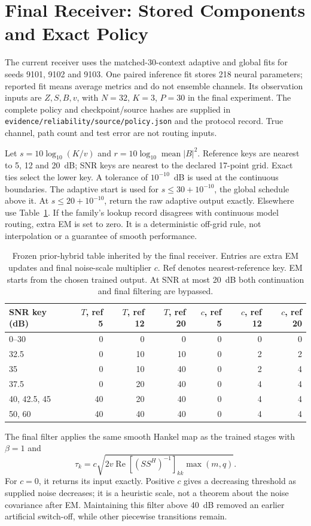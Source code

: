 \section{Final Receiver: Stored Components and Exact Policy}
The current receiver uses the matched-30-context adaptive and global fits for seeds 9101, 9102 and 9103. One paired inference fit stores 218 neural parameters; reported fit means average metrics and do not ensemble channels. Its observation inputs are $Z,S,B,v$, with $N=32$, $K=3$, $P=30$ in the final experiment. The complete policy and checkpoint/source hashes are supplied in \texttt{evidence/reliability/source/policy.json} and the protocol record. True channel, path count and test error are not routing inputs.

Let $s=10\log_{10}(K/v)$ and $r=10\log_{10}\operatorname{mean}|B|^2$. Reference keys are nearest to 5, 12 and 20~dB; SNR keys are nearest to the declared 17-point grid. Exact ties select the lower key. A tolerance of $10^{-10}$~dB is used at the continuous boundaries. The adaptive start is used for $s\le30+10^{-10}$, the global schedule above it. At $s\le20+10^{-10}$, return the raw adaptive output exactly. Elsewhere use Table~\ref{tab:final-policy}. If the family's lookup record disagrees with continuous model routing, extra EM is set to zero. It is a deterministic off-grid rule, not interpolation or a guarantee of smooth performance.

\begin{table}[!t]
\centering\small
\caption{Frozen prior-hybrid table inherited by the final receiver. Entries are extra EM updates and final noise-scale multiplier $c$. Ref denotes nearest-reference key. EM starts from the chosen trained output. At SNR at most 20~dB both continuation and final filtering are bypassed.}
\label{tab:final-policy}
\begin{tabular}{@{}lrrrrrr@{}}\toprule
SNR key (dB)&$T$, ref 5&$T$, ref 12&$T$, ref 20&$c$, ref 5&$c$, ref 12&$c$, ref 20\\\midrule
0--30&0&0&0&0&0&0\\
32.5&0&10&10&0&2&2\\
35&0&10&40&0&2&4\\
37.5&0&20&40&0&4&4\\
40, 42.5, 45&40&20&40&0&4&4\\
50, 60&40&40&40&0&4&4\\\bottomrule
\end{tabular}
\end{table}

The final filter applies the same smooth Hankel map as the trained stages with $\beta=1$ and
\begin{equation}
 \tau_k=c\sqrt{2v\operatorname{Re}[(SS^H)^{-1}]_{kk}\max(m,q)}.
\end{equation}
For $c=0$, it returns its input exactly. Positive $c$ gives a decreasing threshold as supplied noise decreases; it is a heuristic scale, not a theorem about the noise covariance after EM. Maintaining this filter above 40~dB removed an earlier artificial switch-off, while other piecewise transitions remain.


